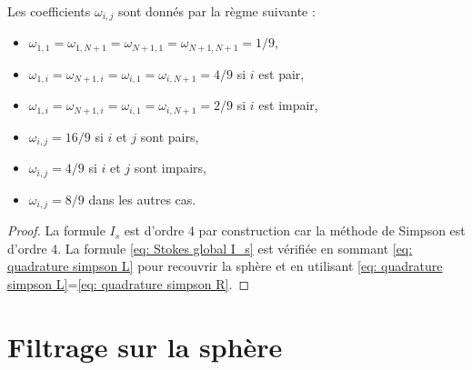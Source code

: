 \begin{remarque}
Les coefficients $\omega_{i,j}$ sont donnés par la règme suivante :
\begin{itemize}
\item $\omega_{1,1}=\omega_{1,N+1}=\omega_{N+1,1}=\omega_{N+1,N+1}=1/9$,
\item $\omega_{1,i}=\omega_{N+1,i}=\omega_{i,1}=\omega_{i,N+1}=4/9$ si $i$ est pair,
\item $\omega_{1,i}=\omega_{N+1,i}=\omega_{i,1}=\omega_{i,N+1}=2/9$ si $i$ est impair,
\item $\omega_{i,j}=16/9$ si $i$ et $j$ sont pairs,
\item $\omega_{i,j}=4/9$ si $i$ et $j$ sont impairs,
\item $\omega_{i,j}=8/9$ dans les autres cas.
\end{itemize}
\end{remarque}

\begin{proof}
La formule $I_s$ est d'ordre 4 par construction car la méthode de Simpson est d'ordre 4.
La formule \eqref{eq: Stokes global I_s} est vérifiée en sommant \eqref{eq: quadrature simpson L} pour recouvrir la sphère et en utilisant \eqref{eq: quadrature simpson L}=\eqref{eq: quadrature simpson R}.
\end{proof}



\section{Filtrage sur la sphère}